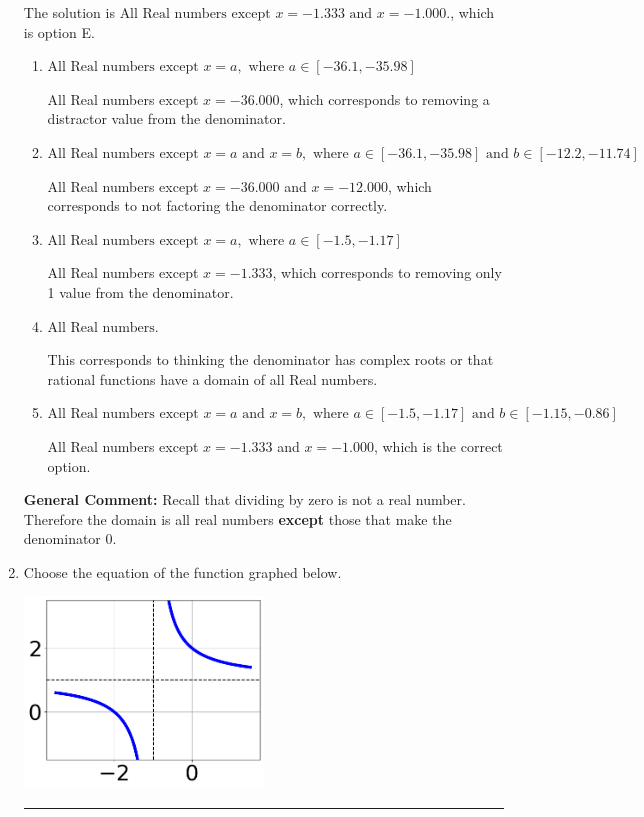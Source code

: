 \documentclass{extbook}[14pt]
\newcommand{\litem}[1]{\item #1

\rule{\textwidth}{0.4pt}}
\begin{document}
\begin{enumerate}
{The solution is \( \text{All Real numbers except } x = -1.333 \text{ and } x = -1.000. \), which is option E.\begin{enumerate}[label=\Alph*.]
\item \( \text{All Real numbers except } x = a, \text{ where } a \in [-36.1, -35.98] \)

All Real numbers except $x = -36.000$, which corresponds to removing a distractor value from the denominator.
\item \( \text{All Real numbers except } x = a \text{ and } x = b, \text{ where } a \in [-36.1, -35.98] \text{ and } b \in [-12.2, -11.74] \)

All Real numbers except $x = -36.000$ and $x = -12.000$, which corresponds to not factoring the denominator correctly.
\item \( \text{All Real numbers except } x = a, \text{ where } a \in [-1.5, -1.17] \)

All Real numbers except $x = -1.333$, which corresponds to removing only 1 value from the denominator.
\item \( \text{All Real numbers.} \)

This corresponds to thinking the denominator has complex roots or that rational functions have a domain of all Real numbers.
\item \( \text{All Real numbers except } x = a \text{ and } x = b, \text{ where } a \in [-1.5, -1.17] \text{ and } b \in [-1.15, -0.86] \)

All Real numbers except $x = -1.333$ and $x = -1.000$, which is the correct option.
\end{enumerate}

\textbf{General Comment:} Recall that dividing by zero is not a real number. Therefore the domain is all real numbers \textbf{except} those that make the denominator 0.
}
\litem{
Choose the equation of the function graphed below.

\begin{center}
    \includegraphics[width=0.5\textwidth]{../Figures/rationalGraphToEquationCopyC.png}
\end{center}




}
\end{enumerate}
\end{document}
